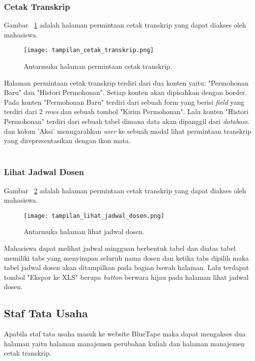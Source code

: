 \subsubsection{Cetak Transkrip}
\noindent Gambar ~\ref{fig:tampilanCetakTranskrip} adalah halaman permintaan cetak transkrip yang dapat diakses oleh mahasiswa.
\begin{figure} [H]
	\centering  
	\texttt{[image: tampilan\_cetak\_transkrip.png]} 
	\caption{Antarmuka halaman permintaan cetak transkrip.} 
	\label{fig:tampilanCetakTranskrip}
\end{figure}
\par Halaman permintaan cetak transkrip terdiri dari dua konten yaitu: "Permohonan Baru" dan "Histori Permohonan". Setiap konten akan dipisahkan dengan border. Pada konten "Permohonan Baru" terdiri dari sebuah form yang berisi \textit{field} yang terdiri dari 2 \textit{rows} dan sebuah tombol "Kirim Permohonan". Lalu konten "Histori Permohonan" terdiri dari sebuah tabel dimana data akan dipanggil dari \textit{database}.  dan kolom 'Aksi' menngarahkan \textit{user} ke sebuah modal lihat permintaan transkrip yang direpresentasikan dengan ikon mata.\\ \\

\subsubsection{Lihat Jadwal Dosen}
\noindent Gambar ~\ref{fig:tampilanLihatJadwalDosen} adalah halaman permintaan cetak transkrip yang dapat diakses oleh mahasiswa.
\begin{figure} [H]
	\centering  
	\texttt{[image: tampilan\_lihat\_jadwal\_dosen.png]} 
	\caption{Antarmuka halaman lihat jadwal dosen.} 
	\label{fig:tampilanLihatJadwalDosen}
\end{figure}
Mahasiswa dapat melihat jadwal mingguan berbentuk tabel dan diatas tabel memiliki tabs yang menyimpan seluruh nama dosen dan ketika tabs dipilih maka tabel jadwal dosen akan ditampilkan pada bagian bawah halaman. 
Lalu terdapat tombol "Ekspor ke XLS" berupa \textit{button} berwara hijau pada halaman lihat jadwal dosen. 

\subsection{Staf Tata Usaha}
Apabila staf tata usaha masuk ke website BlueTape maka dapat mengakses dua halaman yaitu halaman manajemen perubahan kuliah dan halaman manajemen cetak transkrip.
